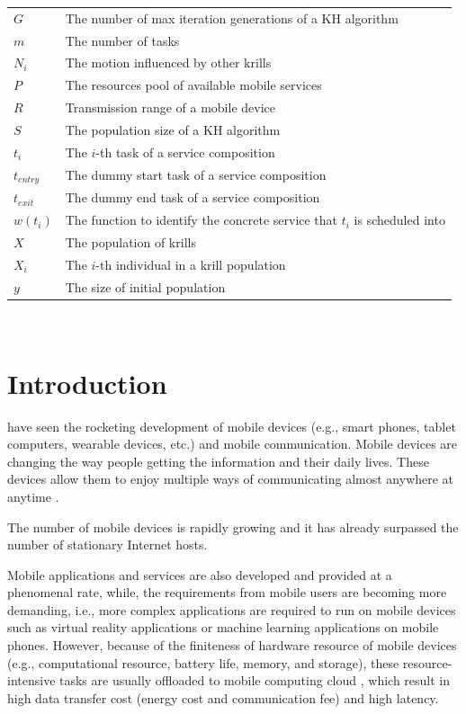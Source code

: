 \documentclass[journal]{IEEEtran}
\begin{document}
\begin{tabular}{@{} l p{7.36cm} }
$G$           &   The number of max iteration generations of a KH algorithm \\
$m$           &   The number of tasks \\
$N_i$         &   The motion influenced by other krills \\
$P$           &   The resources pool of available mobile services \\
$R$           &   Transmission range of a mobile device \\
$S$           &   The population size of a KH algorithm \\
$t_i$         &   The $i$-th task of a service composition \\
$t_{entry}$   &   The dummy start task of a service composition \\
$t_{exit}$    &   The dummy end task of a service composition \\
$w(t_i)$      &   The function to identify the concrete service that $t_i$ is scheduled into \\
$X$           &   The population of krills \\
$X_i$         &   The $i$-th individual in a krill population \\
$y$           &   The size of initial population
\end{tabular}
~\\

\IEEEpeerreviewmaketitle

\section{Introduction}

 have seen the rocketing development of mobile devices (e.g., smart phones, tablet computers, wearable devices, etc.) and mobile communication.
Mobile devices are changing the way people getting the information and their daily lives.
These devices allow them to enjoy multiple ways of communicating almost anywhere at anytime \cite{satyanarayanan2010mobile}.

The number of mobile devices is rapidly growing and it has already surpassed the number of stationary Internet hosts.

Mobile applications and services are also developed and provided at a phenomenal rate, while, the requirements from mobile users are becoming more demanding, i.e., more complex applications are required to run on mobile devices such as virtual reality applications \cite{bastug2017toward} or machine learning applications \cite{abadi2016TensorFlow} on mobile phones. However, because of the finiteness of hardware resource of mobile devices (e.g., computational resource, battery life, memory, and storage), these resource-intensive tasks are usually offloaded to mobile computing cloud \cite{dinh2013survey}, which result in high data transfer cost (energy cost and communication fee) and high latency.
\end{document}
